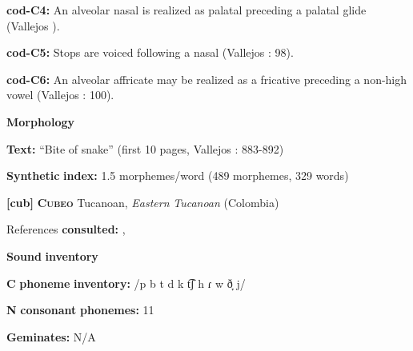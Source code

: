 \begin{styleBody}
\textbf{cod-C4:} An alveolar nasal is realized as palatal preceding a palatal glide (Vallejos \citealt{Yopán2010}).
\end{styleBody}

\begin{styleBody}
\textbf{cod-C5:} Stops are voiced following a nasal (Vallejos \citealt{Yopán2010}: 98).
\end{styleBody}

\begin{styleBody}
\textbf{cod-C6:} An alveolar affricate may be realized as a fricative preceding a non-high vowel (Vallejos \citealt{Yopán2010}: 100).
\end{styleBody}

\begin{styleBody}
\textbf{Morphology}
\end{styleBody}

\begin{styleBody}
\textbf{Text:} “Bite of snake” (first 10 pages, Vallejos \citealt{Yopán2010}: 883-892)
\end{styleBody}

\begin{styleBody}
\textbf{Synthetic} \textbf{index:} 1.5 morphemes/word (489 morphemes, 329 words)
\end{styleBody}

\begin{styleBody}
\textbf{[cub]}   \textbf{\textsc{Cubeo}}    Tucanoan, \textit{Eastern} \textit{Tucanoan} (Colombia)
\end{styleBody}

\begin{styleBody}
References \textbf{consulted:} \citet{Chacon2012}, \citet{MorseMaxwell1999}
\end{styleBody}

\begin{styleBody}
\textbf{Sound} \textbf{inventory}
\end{styleBody}

\begin{styleBody}
\textbf{C} \textbf{phoneme} \textbf{inventory:} /p b t d k t͡ʃ h ɾ w ð̞ j/
\end{styleBody}

\begin{styleBody}
\textbf{N} \textbf{consonant} \textbf{phonemes:} 11
\end{styleBody}

\begin{styleBody}
\textbf{Geminates:} N/A
\end{styleBody}

